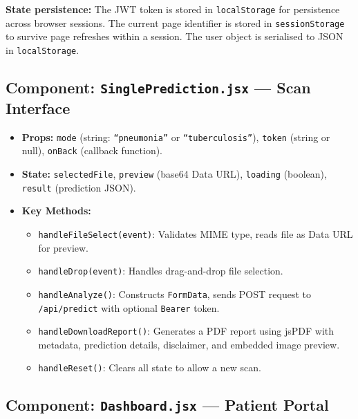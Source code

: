 \documentclass[12pt, a4paper, oneside]{report}
\begin{document}
\textbf{State persistence:} The JWT token is stored in \texttt{localStorage} for persistence across browser sessions. The current page identifier is stored in \texttt{sessionStorage} to survive page refreshes within a session. The user object is serialised to JSON in \texttt{localStorage}.

\subsection{Component: \texttt{SinglePrediction.jsx} --- Scan Interface}

\begin{itemize}
    \item \textbf{Props:} \texttt{mode} (string: \texttt{``pneumonia''} or \texttt{``tuberculosis''}), \texttt{token} (string or null), \texttt{onBack} (callback function).
    \item \textbf{State:} \texttt{selectedFile}, \texttt{preview} (base64 Data URL), \texttt{loading} (boolean), \texttt{result} (prediction JSON).
    \item \textbf{Key Methods:}
    \begin{itemize}
        \item \texttt{handleFileSelect(event)}: Validates MIME type, reads file as Data URL for preview.
        \item \texttt{handleDrop(event)}: Handles drag-and-drop file selection.
        \item \texttt{handleAnalyze()}: Constructs \texttt{FormData}, sends POST request to \texttt{/api/predict} with optional \texttt{Bearer} token.
        \item \texttt{handleDownloadReport()}: Generates a PDF report using jsPDF with metadata, prediction details, disclaimer, and embedded image preview.
        \item \texttt{handleReset()}: Clears all state to allow a new scan.
    \end{itemize}
\end{itemize}

\subsection{Component: \texttt{Dashboard.jsx} --- Patient Portal}
\end{document}
